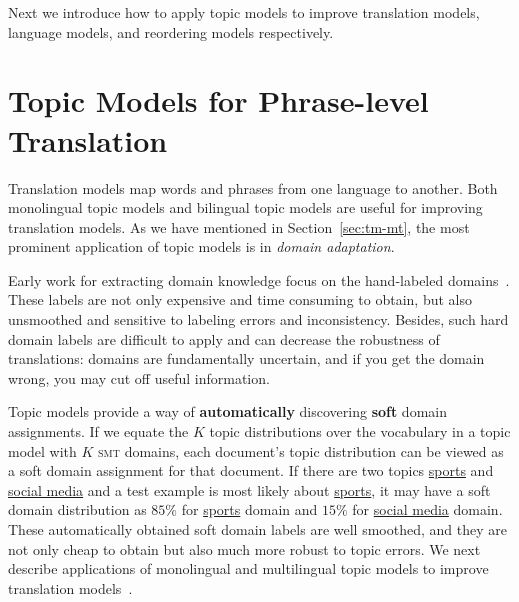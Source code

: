 Next we introduce how to apply topic models to improve translation
models, language models, and reordering models respectively.


\section{Topic Models for Phrase-level Translation}
\label{sec:trans-multiling}

Translation models map words and phrases from one language to another.
Both monolingual topic models and bilingual topic models are useful for improving translation models.
As we have mentioned in Section~\ref{sec:tm-mt}, 
the most prominent application of topic models is in {\em domain adaptation}.

Early work for extracting domain knowledge focus on the hand-labeled domains~\citep{foster-07,matsoukas-09,chiang-11}.
These labels are not only expensive and time consuming to obtain, but also unsmoothed and sensitive 
to labeling errors and inconsistency. Besides, such hard domain labels are difficult to 
apply and can decrease the robustness of translations: domains are fundamentally uncertain, 
and if you get the domain wrong, you may cut off useful information.

Topic models provide a way of \textbf{automatically} discovering \textbf{soft} domain assignments. 
If we equate the $K$ topic distributions over the vocabulary in a topic model with $K$ 
\textsc{smt} domains, each document's topic distribution can be viewed as a soft
domain assignment for that document.
If there are two topics \underline{sports} and \underline{social media} and
a test example is most likely about \underline{sports}, it may
have a soft domain distribution as $85\%$ for \underline{sports}
domain and $15\%$ for \underline{social media} domain. These automatically
obtained soft domain labels are well smoothed, and they are not only
cheap to obtain but also much more robust to topic errors. 
We next describe applications of monolingual and multilingual
topic models to improve translation models~\citep{Eidelman-12,hu-14}.




